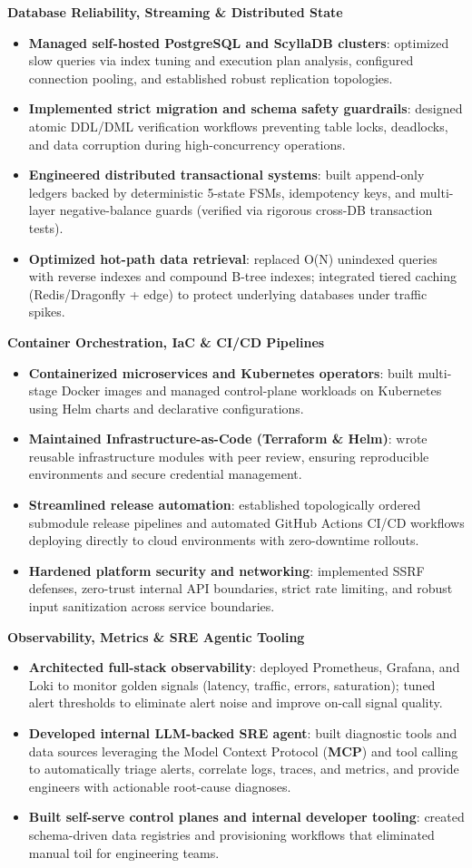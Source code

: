 \documentclass[letterpaper,10pt]{article}
\newcommand{\resumeDash}{\rule[0.6ex]{0.55em}{1.2pt}}
\newcommand{\resumeItem}[1]{\item\small{#1}}
\newcommand{\resumeGroup}[1]{%
  \item[] {\small\bfseries\color{accentblue} #1}\vspace{-3pt}%
}
\newcommand{\resumeItemListStart}{\begin{itemize}[label={\resumeDash}, leftmargin=0.18in, itemsep=1pt, topsep=2pt, parsep=0pt]}
\newcommand{\resumeItemListEnd}{\end{itemize}\vspace{-4pt}}
\begin{document}
\resumeGroup{Database Reliability, Streaming \& Distributed State}
\resumeItemListStart
  \resumeItem{\textbf{Managed self-hosted PostgreSQL and ScyllaDB clusters}: optimized slow queries via index tuning and execution plan analysis, configured connection pooling, and established robust replication topologies.}
  \resumeItem{\textbf{Implemented strict migration and schema safety guardrails}: designed atomic DDL/DML verification workflows preventing table locks, deadlocks, and data corruption during high-concurrency operations.}
  \resumeItem{\textbf{Engineered distributed transactional systems}: built append-only ledgers backed by deterministic 5-state FSMs, idempotency keys, and multi-layer negative-balance guards (verified via rigorous cross-DB transaction tests).}
  \resumeItem{\textbf{Optimized hot-path data retrieval}: replaced O(N) unindexed queries with reverse indexes and compound B-tree indexes; integrated tiered caching (Redis/Dragonfly + edge) to protect underlying databases under traffic spikes.}
\resumeItemListEnd

\resumeGroup{Container Orchestration, IaC \& CI/CD Pipelines}
\resumeItemListStart
  \resumeItem{\textbf{Containerized microservices and Kubernetes operators}: built multi-stage Docker images and managed control-plane workloads on Kubernetes using Helm charts and declarative configurations.}
  \resumeItem{\textbf{Maintained Infrastructure-as-Code (Terraform \& Helm)}: wrote reusable infrastructure modules with peer review, ensuring reproducible environments and secure credential management.}
  \resumeItem{\textbf{Streamlined release automation}: established topologically ordered submodule release pipelines and automated GitHub Actions CI/CD workflows deploying directly to cloud environments with zero-downtime rollouts.}
  \resumeItem{\textbf{Hardened platform security and networking}: implemented SSRF defenses, zero-trust internal API boundaries, strict rate limiting, and robust input sanitization across service boundaries.}
\resumeItemListEnd

\resumeGroup{Observability, Metrics \& SRE Agentic Tooling}
\resumeItemListStart
  \resumeItem{\textbf{Architected full-stack observability}: deployed Prometheus, Grafana, and Loki to monitor golden signals (latency, traffic, errors, saturation); tuned alert thresholds to eliminate alert noise and improve on-call signal quality.}
  \resumeItem{\textbf{Developed internal LLM-backed SRE agent}: built diagnostic tools and data sources leveraging the Model Context Protocol (\textbf{MCP}) and tool calling to automatically triage alerts, correlate logs, traces, and metrics, and provide engineers with actionable root-cause diagnoses.}
  \resumeItem{\textbf{Built self-serve control planes and internal developer tooling}: created schema-driven data registries and provisioning workflows that eliminated manual toil for engineering teams.}
\resumeItemListEnd
\end{document}
